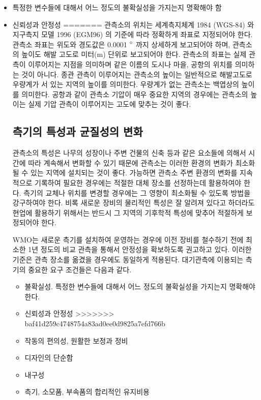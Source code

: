\begin{itemize}
	\item 특정한 변수들에 대해서 어느 정도의 불확실성을 가지는지 명확해야 함
	\item 신뢰성과 안정성
=======
관측소의 위치는 세계측지체계 1984 (WGS-84) 와 지구측지 모델 1996 (EGM96) 의 기준에 따라 정확하게 좌표로 지정되어야 한다. 관측소 좌표는 위도와 경도값은 0.0001 $\rm ^{\circ}$ 까지 상세하게 보고되어야 하며, 관측소의 높이도 해발 고도로 미터(m) 단위로 보고되어야 한다. 관측소의 좌표는 실제 관측이 이루어지는 지점을 의미하며 같은 이름의 도시나 마을, 공항의 위치를 의미하는 것이 아니다. 종관 관측이 이루어지는 관측소의 높이는 일반적으로 해발고도로 우량계가 서 있는 지역의 높이를 의미한다. 우량계가 없는 관측소는 백엽상의 높이를 의미한다. 공항과 같이 관측소 기압이 매우 중요한 지역의 경우에는 관측소의 높이는 실제 기압 관측이 이루어지는 고도에 맞추는 것이 좋다.

\subsection{측기의 특성과 균질성의 변화}
관측소의 특성은 나무의 성장이나 주변 건물의 신축 등과 같은 요소들에 의해서 시간에 따라 계속해서 변화할 수 있기 때문에 관측소는 이러한 환경의 변화가 최소화될 수 있는 지역에 설치되는 것이 좋다. 가능하면 관측소 주변 환경의 변화를 지속적으로 기록하여 필요한 경우에는 적절한 대체 장소를 선정하는데 활용하여야 한다. 측기의 교체나 위치를 변경할 경우에는 그 영향이 최소화될 수 있도록 방법을 강구하여야 한다. 비록 새로운 장비의 물리적인 특성은 잘 알려져 있다고 하더라도 현업에 활용하기 위해서는 반드시 그 지역의 기후학적 특성에 맞추어 적절하게 보정되어야 한다.

WMO는 새로운 측기를 설치하여 운영하는 경우에 이전 장비를 철수하기 전에 최소한 1년 정도의 비교 관측을 통해서 안정성을 확보하도록 권고하고 있다. 이러한 기준은 관측 장소를 옮겼을 경우에도 동일하게 적용된다. 
대기관측에 이용되는 측기의 중요한 요구 조건들은 다음과 같다.

\begin{itemize}
	\item 불확실성. 특정한 변수들에 대해서 어느 정도의 불확실성을 가지는지 명확해야 한다.
	\item  신뢰성과 안정성
>>>>>>> baf41d259c4748754a83ad0ee0d9825a7efd766b
	\item 작동의 편의성, 원활한 보정과 정비
	\item 디자인의 단순함
	\item 내구성
	\item 측기, 소모품, 부속품의 합리적인 유지비용
\end{itemize}


\end{itemize}
